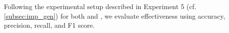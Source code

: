 Following the experimental setup described in Experiment 5 (cf. \autoref{subsec:imp_gen}) for both \impAppr{} and \unmasking{}, we evaluate effectiveness using accuracy, precision, recall, and F1 score.


